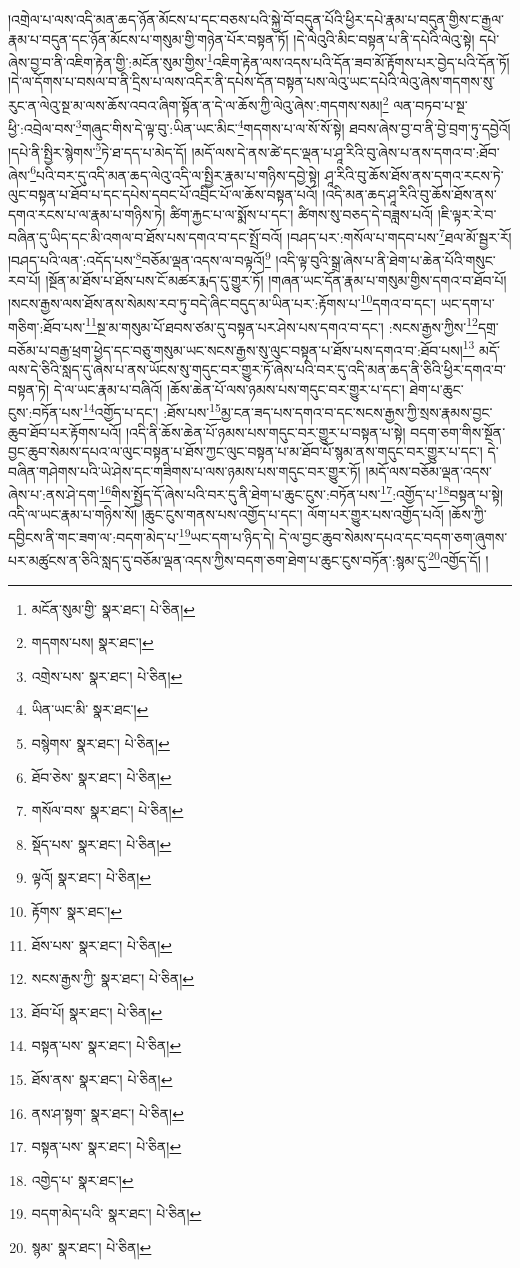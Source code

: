 །འགྲེལ་པ་ལས་འདི་མན་ཆད་ཉོན་མོངས་པ་དང་བཅས་པའི་སྐྱེ་བོ་བདུན་པོའི་ཕྱིར་དཔེ་རྣམ་པ་བདུན་གྱིས་ང་རྒྱལ་རྣམ་པ་བདུན་དང་ཉོན་མོངས་པ་གསུམ་གྱི་གཉེན་པོར་བསྟན་ཏོ། །དེ་ལེའུའི་མིང་བསྟན་པ་ནི་དཔེའི་ལེའུ་སྟེ། དཔེ་ཞེས་བྱ་བ་ནི་འཇིག་རྟེན་གྱི་:མངོན་སུམ་གྱིས་\footnote{མངོན་སུམ་གྱི་  སྣར་ཐང་།  པེ་ཅིན། }འཇིག་རྟེན་ལས་འདས་པའི་དོན་ཟབ་མོ་རྟོགས་པར་བྱེད་པའི་དོན་ཏོ། །དེ་ལ་དོགས་པ་བསལ་བ་ནི་དྲིས་པ་ལས་འདིར་ནི་དཔེས་དོན་བསྟན་པས་ལེའུ་ཡང་དཔེའི་ལེའུ་ཞེས་གདགས་སུ་རུང་ན་ལེའུ་སྔ་མ་ལས་ཆོས་འབའ་ཞིག་སྟོན་ན་དེ་ལ་ཆོས་ཀྱི་ལེའུ་ཞེས་:གདགས་སམ།\footnote{གདགས་པས།  སྣར་ཐང་། } ལན་བཏབ་པ་སྔ་ཕྱི་:འབྲེལ་བས་\footnote{འགྲེས་པས་  སྣར་ཐང་།  པེ་ཅིན། }གཞུང་གིས་དེ་ལྟ་བུ་:ཡིན་ཡང་མིང་\footnote{ཡིན་ཡང་མི་  སྣར་ཐང་། }གདགས་པ་ལ་སོ་སོ་སྟེ། ཐབས་ཞེས་བྱ་བ་ནི་བྱེ་བྲག་ཏུ་དབྱེའོ། །དཔེ་ནི་སྤྱིར་སྙེགས་\footnote{བསྙེགས་  སྣར་ཐང་།  པེ་ཅིན། }ཏེ་ཐ་དད་པ་མེད་དོ། །མདོ་ལས་དེ་ནས་ཚེ་དང་ལྡན་པ་ཤཱ་རིའི་བུ་ཞེས་པ་ནས་དགའ་བ་:ཐོབ་ཞེས་\footnote{ཐོབ་ཅེས་  སྣར་ཐང་།  པེ་ཅིན། }པའི་བར་དུ་འདི་མན་ཆད་ལེའུ་འདི་ལ་སྤྱིར་རྣམ་པ་གཉིས་དབྱེ་སྟེ། ཤཱ་རིའི་བུ་ཆོས་ཐོས་ནས་དགའ་རངས་ཏེ་ལུང་བསྟན་པ་ཐོབ་པ་དང་དཔེས་དབང་པོ་འབྲིང་པོ་ལ་ཆོས་བསྟན་པའོ། །འདི་མན་ཆད་ཤཱ་རིའི་བུ་ཆོས་ཐོས་ནས་དགའ་རངས་པ་ལ་རྣམ་པ་གཉིས་ཏེ། ཚིག་རྐྱང་པ་ལ་སྨོས་པ་དང་། ཚིགས་སུ་བཅད་དེ་བཟླས་པའོ། །ཇི་ལྟར་རེ་བ་བཞིན་དུ་ཡིད་དང་མི་འགལ་བ་ཐོས་པས་དགའ་བ་དང་སྤྲོ་བའོ། །བཤད་པར་:གསོལ་པ་གདབ་པས་\footnote{གསོལ་བས་  སྣར་ཐང་།  པེ་ཅིན། }ཐལ་མོ་སྦྱར་རོ། །བཤད་པའི་ལན་:འདོད་པས་\footnote{སྡོད་པས་  སྣར་ཐང་།  པེ་ཅིན། }བཅོམ་ལྡན་འདས་ལ་བལྟའོ།\footnote{ལྟའོ།  སྣར་ཐང་།  པེ་ཅིན། } །འདི་ལྟ་བུའི་སྒྲ་ཞེས་པ་ནི་ཐེག་པ་ཆེན་པོའི་གསུང་རབ་པོ། །སྔོན་མ་ཐོས་པ་ཐོས་པས་ངོ་མཚར་རྨད་དུ་གྱུར་ཏོ། །གཞན་ཡང་དོན་རྣམ་པ་གསུམ་གྱིས་དགའ་བ་ཐོབ་པོ། །སངས་རྒྱས་ལས་ཐོས་ནས་སེམས་རབ་ཏུ་བདེ་ཞིང་བདུད་མ་ཡིན་པར་:རྟོགས་པ་\footnote{རྟོགས་  སྣར་ཐང་། }དགའ་བ་དང་། ཡང་དག་པ་གཅིག་:ཐོབ་པས་\footnote{ཐོས་པས་  སྣར་ཐང་།  པེ་ཅིན། }སྔ་མ་གསུམ་པོ་ཐབས་ཙམ་དུ་བསྟན་པར་ཤེས་པས་དགའ་བ་དང་། :སངས་རྒྱས་ཀྱིས་\footnote{སངས་རྒྱས་ཀྱི་  སྣར་ཐང་།  པེ་ཅིན། }དགྲ་བཅོམ་པ་བརྒྱ་ཕྲག་ཕྱེད་དང་བཅུ་གསུམ་ཡང་སངས་རྒྱས་སུ་ལུང་བསྟན་པ་ཐོས་པས་དགའ་བ་:ཐོབ་པས།\footnote{ཐོབ་པོ།  སྣར་ཐང་།  པེ་ཅིན། } མདོ་ལས་དེ་ཅིའི་སླད་དུ་ཞེས་པ་ནས་ཡོངས་སུ་གདུང་བར་གྱུར་ཏོ་ཞེས་པའི་བར་དུ་འདི་མན་ཆད་ནི་ཅིའི་ཕྱིར་དགའ་བ་བསྟན་ཏེ། དེ་ལ་ཡང་རྣམ་པ་བཞིའོ། །ཆོས་ཆེན་པོ་ལས་ཉམས་པས་གདུང་བར་གྱུར་པ་དང་། ཐེག་པ་ཆུང་ངུས་:བཏོན་པས་\footnote{བསྟན་པས་  སྣར་ཐང་།  པེ་ཅིན། }འགྱོད་པ་དང་། :ཐོས་པས་\footnote{ཐོས་ནས་  སྣར་ཐང་།  པེ་ཅིན། }མྱ་ངན་ཟད་པས་དགའ་བ་དང་སངས་རྒྱས་ཀྱི་སྲས་རྣམས་བྱང་ཆུབ་ཐོབ་པར་རྟོགས་པའོ། །འདི་ནི་ཆོས་ཆེན་པོ་ཉམས་པས་གདུང་བར་གྱུར་པ་བསྟན་པ་སྟེ། བདག་ཅག་གིས་སྔོན་བྱང་ཆུབ་སེམས་དཔའ་ལ་ལུང་བསྟན་པ་ཐོས་ཀྱང་ལུང་བསྟན་པ་མ་ཐོབ་པོ་སྙམ་ནས་གདུང་བར་གྱུར་པ་དང་། དེ་བཞིན་གཤེགས་པའི་ཡེ་ཤེས་དང་གཟིགས་པ་ལས་ཉམས་པས་གདུང་བར་གྱུར་ཏོ། །མདོ་ལས་བཅོམ་ལྡན་འདས་ཞེས་པ་:ནས་ཤེ་དག་\footnote{ནས་ཤ་སྟག་  སྣར་ཐང་།  པེ་ཅིན། }གིས་སྤྱོད་དོ་ཞེས་པའི་བར་དུ་ནི་ཐེག་པ་ཆུང་ངུས་:བཏོན་པས་\footnote{བསྟན་པས་  སྣར་ཐང་།  པེ་ཅིན། }:འགྱོད་པ་\footnote{འགྱེད་པ་  སྣར་ཐང་། }བསྟན་པ་སྟེ། འདི་ལ་ཡང་རྣམ་པ་གཉིས་སོ། །ཆུང་ངུས་གནས་པས་འགྱོད་པ་དང་། ལོག་པར་གྱུར་པས་འགྱོད་པའོ། །ཆོས་ཀྱི་དབྱིངས་ནི་གང་ཟག་ལ་:བདག་མེད་པ་\footnote{བདག་མེད་པའི་  སྣར་ཐང་།  པེ་ཅིན། }ཡང་དག་པ་ཉིད་དེ། དེ་ལ་བྱང་ཆུབ་སེམས་དཔའ་དང་བདག་ཅག་ཞུགས་པར་མཚུངས་ན་ཅིའི་སླད་དུ་བཅོམ་ལྡན་འདས་ཀྱིས་བདག་ཅག་ཐེག་པ་ཆུང་ངུས་བཏོན་:སྙམ་དུ་\footnote{སྙམ་  སྣར་ཐང་།  པེ་ཅིན། }འགྱོད་དོ། །
